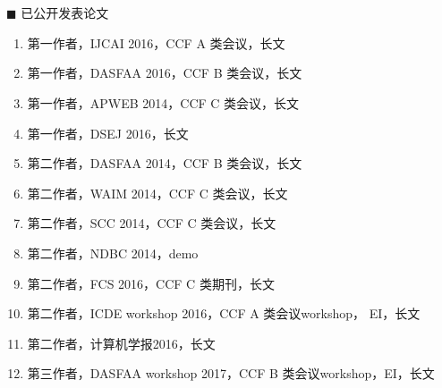 \newpage
\section*{}
{\heiti $\blacksquare$ 已公开发表论文}\vskip 5mm
\begin{spacing}{1}
\begin{enumerate}
	\item 第一作者，IJCAI 2016，CCF A 类会议，长文
	\item 第一作者，DASFAA 2016，CCF B 类会议，长文
	\item 第一作者，APWEB 2014，CCF C 类会议，长文
	\item 第一作者，DSEJ 2016，长文
	\item 第二作者，DASFAA 2014，CCF B 类会议，长文
	\item 第二作者，WAIM 2014，CCF C 类会议，长文
	\item 第二作者，SCC 2014，CCF C 类会议，长文
    \item 第二作者，NDBC 2014，demo
	\item 第二作者，FCS 2016，CCF C 类期刊，长文
	\item 第二作者，ICDE workshop 2016，CCF A 类会议workshop， EI，长文
	\item 第二作者，计算机学报2016，长文
	\item 第三作者，DASFAA workshop 2017，CCF B 类会议workshop，EI，长文
\end{enumerate}
\end{spacing}

